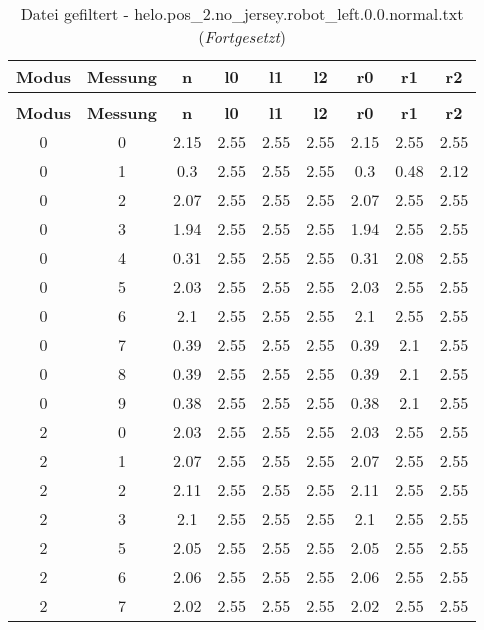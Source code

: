 \begin{longtable}{|c|c||c||c|c|c||c|c|c|}
	\caption{Datei gefiltert - helo.pos\_2.no\_jersey.robot\_left.0.0.normal.txt} \label{tab:helo.pos-2.no-jersey.robot-left.0.0.normal.txt} \\ \hline
	\textbf{Modus} & \textbf{Messung} & \textbf{n} & \textbf{l0} & \textbf{l1} & \textbf{l2} & \textbf{r0} & \textbf{r1} & \textbf{r2}\\ \hline
	\endfirsthead
	\caption[]{Datei gefiltert - helo.pos\_2.no\_jersey.robot\_left.0.0.normal.txt (\emph{Fortgesetzt})} \\ \hline
	\textbf{Modus} & \textbf{Messung} & \textbf{n} & \textbf{l0} & \textbf{l1} & \textbf{l2} & \textbf{r0} & \textbf{r1} & \textbf{r2}\\ \hline
	\endhead
	0 & 0 & 2.15 & 2.55 & 2.55 & 2.55 & 2.15 & 2.55 & 2.55 \\ \hline
	0 & 1 & 0.3 & 2.55 & 2.55 & 2.55 & 0.3 & 0.48 & 2.12 \\ \hline
	0 & 2 & 2.07 & 2.55 & 2.55 & 2.55 & 2.07 & 2.55 & 2.55 \\ \hline
	0 & 3 & 1.94 & 2.55 & 2.55 & 2.55 & 1.94 & 2.55 & 2.55 \\ \hline
	0 & 4 & 0.31 & 2.55 & 2.55 & 2.55 & 0.31 & 2.08 & 2.55 \\ \hline
	0 & 5 & 2.03 & 2.55 & 2.55 & 2.55 & 2.03 & 2.55 & 2.55 \\ \hline
	0 & 6 & 2.1 & 2.55 & 2.55 & 2.55 & 2.1 & 2.55 & 2.55 \\ \hline
	0 & 7 & 0.39 & 2.55 & 2.55 & 2.55 & 0.39 & 2.1 & 2.55 \\ \hline
	0 & 8 & 0.39 & 2.55 & 2.55 & 2.55 & 0.39 & 2.1 & 2.55 \\ \hline
	0 & 9 & 0.38 & 2.55 & 2.55 & 2.55 & 0.38 & 2.1 & 2.55 \\ \hline
	2 & 0 & 2.03 & 2.55 & 2.55 & 2.55 & 2.03 & 2.55 & 2.55 \\ \hline
	2 & 1 & 2.07 & 2.55 & 2.55 & 2.55 & 2.07 & 2.55 & 2.55 \\ \hline
	2 & 2 & 2.11 & 2.55 & 2.55 & 2.55 & 2.11 & 2.55 & 2.55 \\ \hline
	2 & 3 & 2.1 & 2.55 & 2.55 & 2.55 & 2.1 & 2.55 & 2.55 \\ \hline
	2 & 5 & 2.05 & 2.55 & 2.55 & 2.55 & 2.05 & 2.55 & 2.55 \\ \hline
	2 & 6 & 2.06 & 2.55 & 2.55 & 2.55 & 2.06 & 2.55 & 2.55 \\ \hline
	2 & 7 & 2.02 & 2.55 & 2.55 & 2.55 & 2.02 & 2.55 & 2.55 \\ \hline

\end{longtable}
